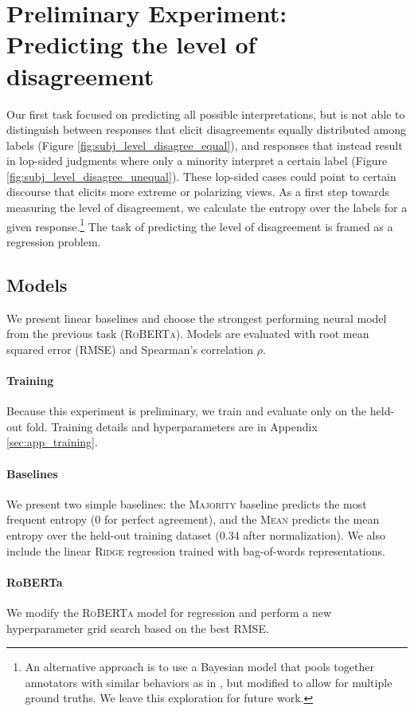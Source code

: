 \section{Preliminary Experiment: Predicting the level of disagreement}
Our first task focused on predicting all possible interpretations, but is not able to distinguish between responses that elicit disagreements equally distributed among labels (Figure \ref{fig:subj_level_disagree_equal}), and responses that instead result in lop-sided judgments where only a minority interpret a certain label (Figure \ref{fig:subj_level_disagree_unequal}). These lop-sided cases could point to certain discourse that elicits more extreme or polarizing views. As a first step towards measuring the level of disagreement, we calculate the entropy over the labels for a given response.\footnote{An alternative approach is to use a Bayesian model that pools together annotators with similar behaviors as in , but modified to allow for multiple ground truths. We leave this exploration for future work.} The task of predicting the level of disagreement is framed as a regression problem.

\subsection{Models}
We present linear baselines and choose the strongest performing neural model from the previous task (\textsc{RoBERTa}). Models are evaluated with root mean squared error (RMSE) and Spearman's correlation $\rho$.

\paragraph{Training} Because this experiment is preliminary, we train and evaluate only on the held-out fold. Training details and hyperparameters are in Appendix \ref{sec:app_training}.

\paragraph{Baselines} We present two simple baselines: the \textsc{Majority} baseline predicts the most frequent entropy (0 for perfect agreement), and the \textsc{Mean} predicts the mean entropy over the held-out training dataset (0.34 after normalization). We also include the linear \textsc{Ridge} regression trained with bag-of-words representations.

\paragraph{RoBERTa} We modify the \textsc{RoBERTa} model for regression and perform a new hyperparameter grid search based on the best RMSE. 


